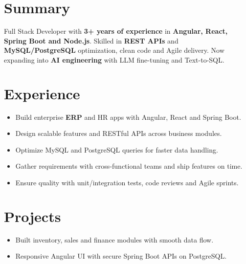 \documentclass[]{deedy-resume-openfont}
\renewcommand{\sectionsep}{\vspace{6pt}}
\begin{document}

\raggedright

\section{Summary}
Full Stack Developer with \textbf{3+ years of experience} in \textbf{Angular, React, Spring Boot and Node.js}. Skilled in \textbf{REST APIs} and \textbf{MySQL/PostgreSQL} optimization, clean code and Agile delivery. Now expanding into \textbf{AI engineering} with LLM fine-tuning and Text-to-SQL.
\sectionsep

\section{Experience}
\begin{itemize}
  \item Build enterprise \textbf{ERP} and HR apps with Angular, React and Spring Boot.
  \item Design scalable features and RESTful APIs across business modules.
  \item Optimize MySQL and PostgreSQL queries for faster data handling.
  \item Gather requirements with cross-functional teams and ship features on time.
  \item Ensure quality with unit/integration tests, code reviews and Agile sprints.
\end{itemize}
\sectionsep

\section{Projects}
\begin{itemize}
  \item Built inventory, sales and finance modules with smooth data flow.
  \item Responsive Angular UI with secure Spring Boot APIs on PostgreSQL.
\end{itemize}
\sectionsep
\end{document}
